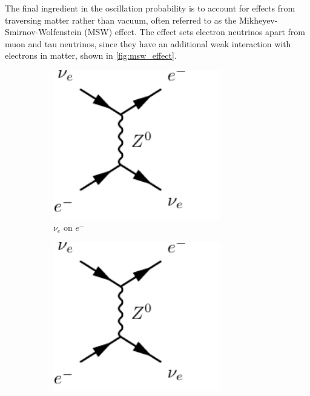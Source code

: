 The final ingredient in the oscillation probability is to account for effects from traversing matter rather than vacuum, often referred to as the Mikheyev-Smirnov-Wolfenstein (MSW) effect\cite{barger,parke,wolfenstein,msw}. The effect sets electron neutrinos apart from muon and tau neutrinos, since they have an additional weak interaction with electrons in matter, shown in \autoref{fig:msw_effect}.
\begin{figure}[h]
	\begin{subfigure}[t]{0.32\textwidth}
		\includegraphics[width=0.8\textwidth, clip,page=1]{figures/theory/feynmp_crop}
		\caption{$\nu_e$ on $e^-$}
	\end{subfigure}
	\begin{subfigure}[t]{0.32\textwidth}
		\includegraphics[width=0.8\textwidth, clip,page=3]{figures/theory/feynmp_crop}

\end{subfigure}
\end{figure}
